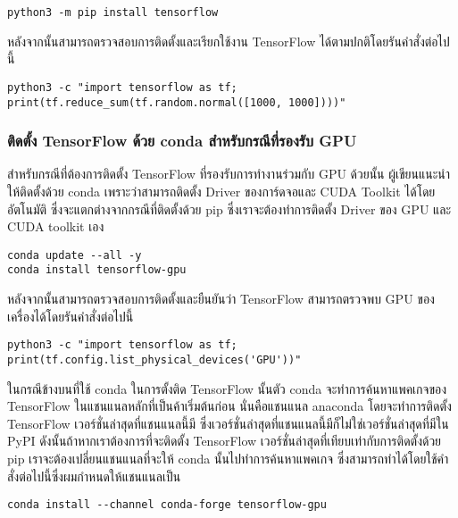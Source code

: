 \begin{lstlisting}[style=MyBash]
python3 -m pip install tensorflow
\end{lstlisting}

หลังจากนั้นสามารถตรวจสอบการติดตั้งและเรียกใช้งาน TensorFlow ได้ตามปกติโดยรันคำสั่งต่อไปนี้

\begin{lstlisting}[style=MyBash]
python3 -c "import tensorflow as tf; print(tf.reduce_sum(tf.random.normal([1000, 1000])))"
\end{lstlisting}

\subsubsection{ติดตั้ง TensorFlow ด้วย conda สำหรับกรณีที่รองรับ GPU}

สำหรับกรณีที่ต้องการติดตั้ง TensorFlow ที่รองรับการทำงานร่วมกับ GPU ด้วยนั้น ผู้เขียนแนะนำให้ติดตั้งด้วย conda เพราะว่าสามารถติดตั้ง Driver
ของการ์ดจอและ CUDA Toolkit ได้โดยอัตโนมัติ ซึ่งจะแตกต่างจากกรณีที่ติดตั้งด้วย pip ซึ่งเราจะต้องทำการติดตั้ง Driver ของ GPU และ 
CUDA toolkit เอง

\begin{lstlisting}[style=MyBash]
conda update --all -y
conda install tensorflow-gpu
\end{lstlisting}

หลังจากนั้นสามารถตรวจสอบการติดตั้งและยืนยันว่า TensorFlow สามารถตรวจพบ GPU ของเครื่องได้โดยรันคำสั่งต่อไปนี้

\begin{lstlisting}[style=MyBash]
python3 -c "import tensorflow as tf; print(tf.config.list_physical_devices('GPU'))"
\end{lstlisting}

ในกรณีข้างบนที่ใช้ conda ในการตั้งติด TensorFlow นั้นตัว conda จะทำการค้นหาแพคเกจของ TensorFlow ในแชนแนลหลักที่เป็นค้าเริ่มต้นก่อน
นั่นคือแชนแนล anaconda โดยจะทำการติดตั้ง TensorFlow เวอร์ชั่นล่าสุดที่แชนแนลนี้มี ซึ่งเวอร์ชั่นล่าสุดที่แชนแนลนี้มีก็ไม่ใช่เวอร์ชั่นล่าสุดที่มีใน
PyPI ดังนั้นถ้าหากเราต้องการที่จะติดตั้ง TensorFlow เวอร์ชั่นล่าสุดที่เทียบเท่ากับการติดตั้งด้วย pip เราจะต้องเปลี่ยนแชนแนลที่จะให้ conda
นั้นไปทำการค้นหาแพคเกจ ซึ่งสามารถทำได้โดยใช้คำสั่งต่อไปนี้ซึ่งผมกำหนดให้แชนแนลเป็น 

\begin{lstlisting}[style=MyBash]
    conda install --channel conda-forge tensorflow-gpu
\end{lstlisting}
